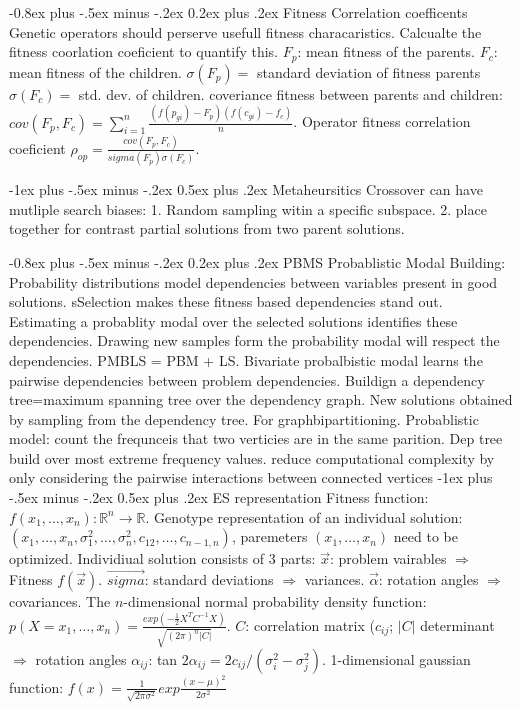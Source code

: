 \documentclass[8pt,landscape]{extarticle}
\makeatletter
\renewcommand{\section}{\@startsection{section}{1}{0mm}%
                                {-1ex plus -.5ex minus -.2ex}%
                                {0.5ex plus .2ex}%
                                {\normalfont\large\bfseries}}
\renewcommand{\subsection}{\@startsection{subsection}{2}{0mm}%
                                {-0.8ex plus -.5ex minus -.2ex}%
                                {0.2ex plus .2ex}%
                                {\normalfont\normalsize\bfseries}}
\makeatother
\begin{document}
\begin{multicols}{4}
\subsection{Fitness Correlation coefficents}
Genetic operators should perserve usefull fitness characaristics.
Calcualte the fitness coorlation coeficient to quantify this.
$F_p$: mean fitness of the parents. $F_c$: mean fitness of the children.
$\sigma(F_p) =$ standard deviation of fitness parents
$\sigma(F_c) =$ std. dev. of children. coveriance fitness between parents and children:
$cov(F_p,F_c)=\sum^n_{i=1}\frac{(f(p_{gi})-F_p)(f(c_{gi})-f_c)}{n}$.
Operator fitness correlation coeficient
$\rho_{op}=\frac{cov(F_p,F_c)}{sigma(F_p)\sigma(F_c)}$.

\section{Metaheursitics}
Crossover can have mutliple search biases:
1. Random sampling witin a specific subspace. 2. place together for contrast
partial solutions from two parent solutions.

\subsection{PBMS}
Probablistic Modal Building: Probability distributions model dependencies 
between variables present in good solutions. sSelection makes these fitness 
based dependencies stand out. Estimating a probablity modal over the selected
solutions identifies these dependencies. Drawing new samples form the probability
modal will respect the dependencies.
PMBLS = PBM + LS. Bivariate probalbistic modal learns the pairwise dependencies
between problem dependencies. Buildign a dependency tree=maximum spanning tree
over the dependency graph. New solutions obtained by sampling from the dependency
tree.
For graphbipartitioning. Probablistic model: count the frequnceis that two
verticies are in the same parition. Dep tree build over most extreme frequency
values. reduce computational complexity by only considering the
pairwise interactions between connected vertices
\section{ES representation}
Fitness function: $f(x_1,\dots,x_n):\mathbb{R}^n\to \mathbb{R}$.
Genotype representation of an individual solution:
$(x_1,\dots,x_n,\sigma^2_1,\dots,\sigma^2_n, c_{12},\dots,c_{n-1,n})$,
paremeters $(x_1, \dots,x_n)$ need to be optimized.
Individiual solution consists of 3 parts: $\vec{x}$: problem vairables
$\Rightarrow$ Fitness $f(\vec{x})$. $\vec{sigma}$: standard deviations
$\Rightarrow$ variances. $\vec{\alpha}$: rotation angles $\Rightarrow$
covariances. The $n$-dimensional normal probability density function:
$p(X=x_1,\dots,x_n)=\frac{exp(-\frac{1}{2}X^TC^{-1}X)}{\sqrt{(2\pi)^n|C|}}$.
$C$: correlation matrix ($c_{ij}$; $|C|$ determinant $\Rightarrow$ rotation 
angles $\alpha_{ij}$: tan $2\alpha_{ij}=2c_{ij}/(\sigma^2_i-\sigma^2_j)$.
1-dimensional gaussian function:
$f(x)=\frac{1}{\sqrt{2\pi \sigma^2}}exp\frac{(x-\mu)^2}{2\sigma^2}$

\end{multicols}
\end{document}
